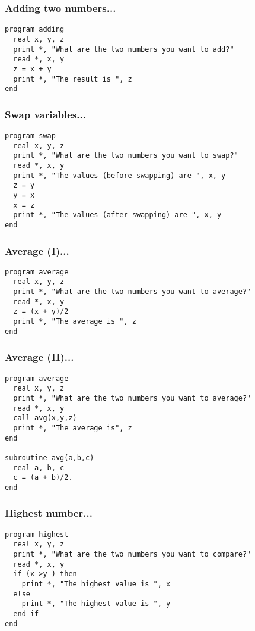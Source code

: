 \documentclass[xcolor=dvipsnames,dvip,notes=show,table]{beamer}
\begin{document}
% 

\begin{frame}[fragile]
\frametitle{Adding two numbers...}
\scriptsize
\begin{lstlisting}
program adding
  real x, y, z
  print *, "What are the two numbers you want to add?"
  read *, x, y  
  z = x + y
  print *, "The result is ", z
end
\end{lstlisting}
\end{frame}


\begin{frame}[fragile]
\frametitle{Swap variables...}

\scriptsize
\begin{lstlisting}
program swap
  real x, y, z
  print *, "What are the two numbers you want to swap?"
  read *, x, y
  print *, "The values (before swapping) are ", x, y
  z = y
  y = x
  x = z
  print *, "The values (after swapping) are ", x, y
end
\end{lstlisting}
\end{frame}

\begin{frame}[fragile]
\frametitle{Average (I)...}

\scriptsize
\begin{lstlisting}
program average
  real x, y, z
  print *, "What are the two numbers you want to average?"
  read *, x, y
  z = (x + y)/2
  print *, "The average is ", z
end
\end{lstlisting}
\end{frame}


\begin{frame}[fragile]
\frametitle{Average (II)...}

\scriptsize
\begin{lstlisting}
program average
  real x, y, z
  print *, "What are the two numbers you want to average?"
  read *, x, y
  call avg(x,y,z)
  print *, "The average is", z
end
 
subroutine avg(a,b,c)
  real a, b, c
  c = (a + b)/2.
end
\end{lstlisting}
\end{frame}


\begin{frame}[fragile]
\frametitle{Highest number...}

\scriptsize
\begin{lstlisting}
program highest
  real x, y, z
  print *, "What are the two numbers you want to compare?"
  read *, x, y
  if (x >y ) then 
    print *, "The highest value is ", x
  else 
    print *, "The highest value is ", y
  end if
end
\end{lstlisting}
\end{frame}
\end{document}
